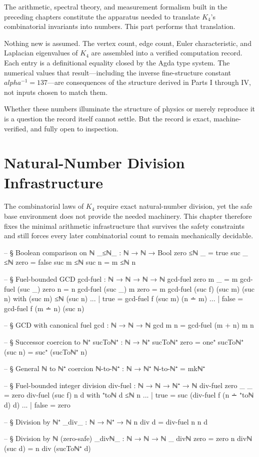\documentclass[11pt,a4paper]{book}
\def\alpha{alpha}%
\begin{document}
The arithmetic, spectral theory, and measurement formalism built in the preceding chapters constitute the apparatus needed to translate $K_4$'s combinatorial invariants into numbers. This part performs that translation.

Nothing new is assumed. The vertex count, edge count, Euler characteristic, and Laplacian eigenvalues of $K_4$ are assembled into a verified computation record. Each entry is a definitional equality closed by the Agda type system. The numerical values that result---including the inverse fine-structure constant $\alpha^{-1} = 137$---are consequences of the structure derived in Parts I through IV, not inputs chosen to match them.

Whether these numbers illuminate the structure of physics or merely reproduce it is a question the record itself cannot settle. But the record is exact, machine-verified, and fully open to inspection.

\chapter{Natural-Number Division Infrastructure}

The combinatorial laws of $K_4$ require exact natural-number division, yet the safe base environment does not provide the needed machinery. This chapter therefore fixes the minimal arithmetic infrastructure that survives the safety constraints and still forces every later combinatorial count to remain mechanically decidable.

\begin{code}
-- § Boolean comparison on ℕ
_≤ℕ_ : ℕ → ℕ → Bool
zero  ≤ℕ _     = true
suc _ ≤ℕ zero  = false
suc m ≤ℕ suc n = m ≤ℕ n

-- § Fuel-bounded GCD
gcd-fuel : ℕ → ℕ → ℕ → ℕ
gcd-fuel zero    m _       = m
gcd-fuel (suc _) zero n    = n
gcd-fuel (suc _) m zero    = m
gcd-fuel (suc f) (suc m) (suc n) with (suc m) ≤ℕ (suc n)
... | true  = gcd-fuel f (suc m) (n ∸ m)
... | false = gcd-fuel f (m ∸ n) (suc n)

-- § GCD with canonical fuel
gcd : ℕ → ℕ → ℕ
gcd m n = gcd-fuel (m + n) m n

-- § Successor coercion to ℕ⁺
sucToℕ⁺ : ℕ → ℕ⁺
sucToℕ⁺ zero = one⁺
sucToℕ⁺ (suc n) = suc⁺ (sucToℕ⁺ n)

-- § General ℕ to ℕ⁺ coercion
ℕ-to-ℕ⁺ : ℕ → ℕ⁺
ℕ-to-ℕ⁺ = mkℕ⁺

-- § Fuel-bounded integer division
div-fuel : ℕ → ℕ → ℕ⁺ → ℕ
div-fuel zero    _       _ = zero
div-fuel (suc f) n d with ⁺toℕ d ≤ℕ n
... | true  = suc (div-fuel f (n ∸ ⁺toℕ d) d)
... | false = zero

-- § Division by ℕ⁺
_div_ : ℕ → ℕ⁺ → ℕ
n div d = div-fuel n n d

-- § Division by ℕ (zero-safe)
_divℕ_ : ℕ → ℕ → ℕ
_ divℕ zero = zero
n divℕ (suc d) = n div (sucToℕ⁺ d)
\end{code}
\end{document}
